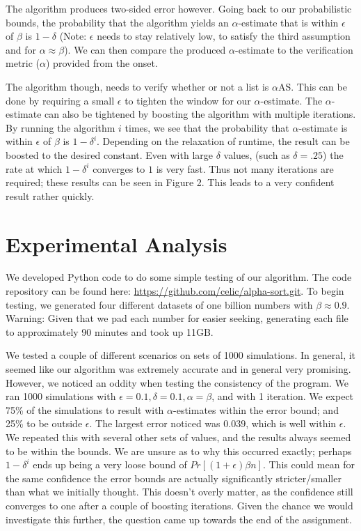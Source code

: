 \documentclass[11pt]{article}
\begin{document}
The algorithm produces two-sided error however. Going back to our probabilistic bounds, the probability that the algorithm yields an $\alpha$-estimate that is within $\epsilon$ of $\beta$ is $1 - \delta$ (Note: $\epsilon$ needs to stay relatively low, to satisfy the third assumption and for $\alpha \approx \beta$). We can then compare the produced $\alpha$-estimate to the verification metric ($\alpha$) provided from the onset. 

The algorithm though, needs to verify whether or not a list is $\alpha$AS. This can be done by requiring a small $\epsilon$ to tighten the window for our $\alpha$-estimate. The $\alpha$-estimate can also be tightened by boosting the algorithm with multiple iterations. By running the algorithm $i$ times, we see that the probability that $\alpha$-estimate is within $\epsilon$ of $\beta$ is $1 - \delta^i$. Depending on the relaxation of runtime, the result can be boosted to the desired constant. Even with large $\delta$ values, (such as $\delta = .25$) the rate at which $1 - \delta^i$ converges to $1$ is very fast. Thus not many iterations are required; these results can be seen in Figure 2. This leads to a very confident result rather quickly.

\section{Experimental Analysis}

We developed Python code to do some simple testing of our algorithm. The code repository can be found here: \url{https://github.com/celic/alpha-sort.git}. To begin testing, we generated four different datasets of one billion numbers with $\beta \approx 0.9$. Warning: Given that we pad each number for easier seeking, generating each file to approximately 90 minutes and took up 11GB. 

We tested a couple of different scenarios on sets of 1000 simulations. In general, it seemed like our algorithm was extremely accurate and in general very promising. However, we noticed an oddity when testing the consistency of the program. We ran 1000 simulations with $\epsilon=0.1, \delta=0.1, \alpha=\beta$, and with 1 iteration. We expect 75\% of the simulations to result with $\alpha$-estimates within the error bound; and 25\% to be outside $\epsilon$. The largest error noticed was $0.039$, which is well within $\epsilon$. We repeated this with several other sets of values, and the results always seemed to be within the bounds. We are unsure as to why this occurred exactly; perhaps $1 - \delta^i$ ends up being a very loose bound of $Pr[(1+\epsilon)\beta n]$. This could mean for the same confidence the error bounds are actually significantly stricter/smaller than what we initially thought. This doesn't overly matter, as the confidence still converges to one after a couple of boosting iterations. Given the chance we would investigate this further, the question came up towards the end of the assignment.
\end{document}
